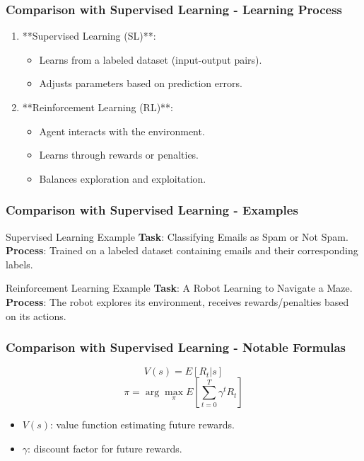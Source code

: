 \documentclass[aspectratio=169]{beamer}
\begin{document}
\begin{frame}[fragile]
    \frametitle{Comparison with Supervised Learning - Learning Process}
    \begin{enumerate}
        \item **Supervised Learning (SL)**:
            \begin{itemize}
                \item Learns from a labeled dataset (input-output pairs).
                \item Adjusts parameters based on prediction errors.
            \end{itemize}
        \item **Reinforcement Learning (RL)**:
            \begin{itemize}
                \item Agent interacts with the environment.
                \item Learns through rewards or penalties.
                \item Balances exploration and exploitation.
            \end{itemize}
    \end{enumerate}
\end{frame}

\begin{frame}[fragile]
    \frametitle{Comparison with Supervised Learning - Examples}
    \begin{block}{Supervised Learning Example}
        \textbf{Task}: Classifying Emails as Spam or Not Spam.\\
        \textbf{Process}: Trained on a labeled dataset containing emails and their corresponding labels.
    \end{block}
    
    \begin{block}{Reinforcement Learning Example}
        \textbf{Task}: A Robot Learning to Navigate a Maze.\\
        \textbf{Process}: The robot explores its environment, receives rewards/penalties based on its actions.
    \end{block}
\end{frame}

\begin{frame}[fragile]
    \frametitle{Comparison with Supervised Learning - Notable Formulas}
    \begin{equation}
        V(s) = E[R_t | s]
    \end{equation}
    \begin{equation}
        \pi = \arg\max_{\pi} E\left[\sum_{t=0}^{T} \gamma^t R_t \right]
    \end{equation}
    \begin{itemize}
        \item $V(s)$: value function estimating future rewards.
        \item $\gamma$: discount factor for future rewards.
    \end{itemize}
\end{frame}
\end{document}
